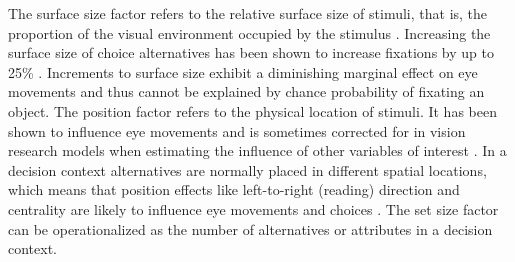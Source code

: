  The surface size factor refers to the relative surface size of stimuli, that is, the proportion of the visual environment occupied by the stimulus \citep[for a review see][]{peschel2013a}. Increasing the surface size of choice alternatives has been shown to increase fixations by up to 25\% \citep{chandon2009a}. Increments to surface size exhibit a diminishing marginal effect on eye movements \citep{lohse1997a} and thus cannot be explained by chance probability of fixating an object. The position factor refers to the physical location of stimuli. It has been shown to influence eye movements and is sometimes corrected for in vision research models when estimating the influence of other variables of interest \citep{clarke2014a}. In a decision context alternatives are normally placed in different spatial locations, which means that position effects like left-to-right (reading) direction and centrality are likely to influence eye movements and choices \citep{atalay2012a, meissner2016a}. The set size factor can be operationalized as the number of alternatives or attributes in a decision context.   \\

